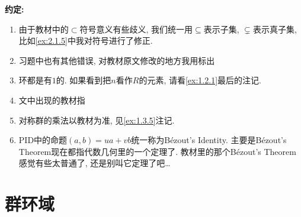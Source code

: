 \textbf{约定:} \begin{enumerate}
    \item 由于教材中的$\subset$符号意义有些歧义, 我们统一用$\subseteq$表示子集, $\subsetneq$表示真子集, 比如\ref{ex:2.1.5}中我对符号进行了修正.
    \item 习题中也有其他错误, 对教材原文修改的地方我用标出
    \item 环都是有$1$的. 如果看到把$n$看作$R$的元素, 请看\ref{ex:1.2.1}最后的注记.
    \item 文中出现的教材指\cite{2022抽象代数}
    \item 对称群的乘法以教材为准, 见\ref{ex:1.3.5}注记.
    \item PID中的命题$(a, b) = ua + vb$统一称为Bézout's Identity. 主要是Bézout's Theorem现在都指代数几何里的一个定理了. 教材里的那个Bézout's Theorem感觉有些太普通了, 还是别叫它定理了吧\dots
\end{enumerate}

\section{群环域}



